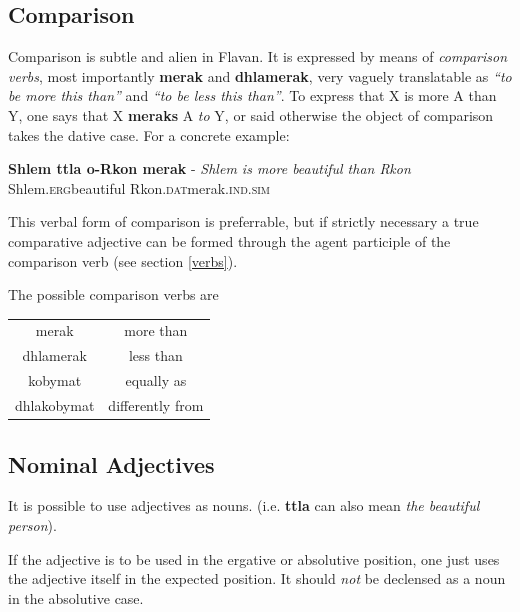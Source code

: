 \documentclass[10pt,oneside]{memoir}
\newcommand{\flav}[1]{  
    \rotatebox[origin=c]{270}{
		\begin{varwidth}{10 cm}
			{\centering \flavan  #1}
		\end{varwidth}
    }
    }
\newcommand{\Flav}[1]{{\Large \flav{#1}}}
\newcommand{\grammar}[1]{\textsc{#1}}
\newcommand{\ERG}{\grammar{erg}}
\newcommand{\DAT}{\grammar{dat}}
\newcommand{\SIM}{\grammar{sim}}
\newcommand{\IND}{\grammar{ind}}
\begin{document}
\subsection{Comparison}

Comparison is subtle and alien in Flavan. It is expressed by means of \emph{comparison verbs}, most importantly \textbf{merak} and \textbf{dhlamerak}, very vaguely translatable as \emph{``to be more this than''} and \emph{``to be less this than''}. To express that X is more A than Y, one says that X \textbf{meraks} A \emph{to} Y, or said otherwise the object of comparison takes the dative case. For a concrete example:

\begin{center}
	\textbf{Shlem ttla o-Rkon merak} - \emph{Shlem is more beautiful than Rkon}\\
	Shlem.\ERG beautiful Rkon.\DAT merak.\IND.\SIM\\
	\Flav{shlem ttlaa\\orkon merak}
\end{center}

This verbal form of comparison is preferrable, but if strictly necessary a true comparative adjective can be formed through the agent participle of the comparison verb (see section \ref{verbs}).

The possible comparison verbs are

\begin{center}
\begin{tabular}{c | c}
	merak & more than\\
	dhlamerak & less than\\
	kobymat & equally as\\
	dhlakobymat & differently from
\end{tabular}
\end{center}







\subsection{Nominal Adjectives}

It is possible to use adjectives as nouns. (i.e. \textbf{ttla} can also mean \emph{the beautiful person}). 

If the adjective is to be used in the ergative or absolutive position, one just uses the adjective itself in the expected position. It should \emph{not} be declensed as a noun in the absolutive case.
\end{document}
